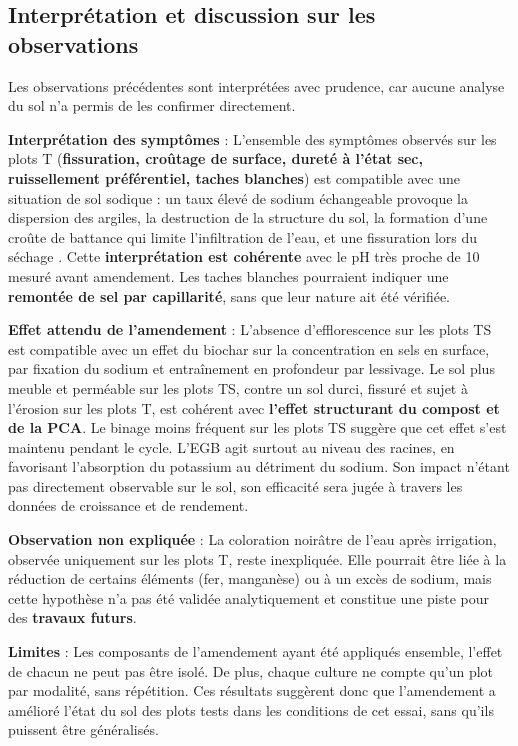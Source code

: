\subsection{Interprétation et discussion sur les observations}
Les observations précédentes sont interprétées avec prudence, car aucune analyse du sol n’a permis de les confirmer directement.

\textbf{Interprétation des symptômes} : L’ensemble des symptômes observés sur les plots T (\textbf{fissuration, croûtage de surface, dureté à l’état sec, ruissellement préférentiel, taches blanches}) est compatible avec une situation de sol sodique : 
un taux élevé de sodium échangeable provoque la dispersion des argiles, la destruction de la structure du sol, la formation d’une croûte de battance qui limite l’infiltration de l’eau, et une fissuration lors du séchage \cite{niaz_organic_2022}. 
Cette \textbf{interprétation est cohérente} avec le pH très proche de 10 mesuré avant amendement. Les taches blanches pourraient indiquer une \textbf{remontée de sel par capillarité}, sans que leur nature ait été vérifiée.

\textbf{Effet attendu de l’amendement} : L’absence d’efflorescence sur les plots TS est compatible avec un effet du biochar sur la concentration en sels en surface, par fixation du sodium et entraînement en profondeur par lessivage. 
Le sol plus meuble et perméable sur les plots TS, contre un sol durci, fissuré et sujet à l’érosion sur les plots T, est cohérent avec \textbf{l’effet structurant du compost et de la PCA}. Le binage moins fréquent sur les plots TS suggère que cet effet s’est maintenu pendant le cycle. 
L’EGB agit surtout au niveau des racines, en favorisant l’absorption du potassium au détriment du sodium. Son impact n’étant pas directement observable sur le sol, son efficacité sera jugée à travers les données de croissance et de rendement.

\textbf{Observation non expliquée} : La coloration noirâtre de l’eau après irrigation, observée uniquement sur les plots T, reste inexpliquée. 
Elle pourrait être liée à la réduction de certains éléments (fer, manganèse) ou à un excès de sodium, mais cette hypothèse n’a pas été validée analytiquement et constitue une piste pour des \textbf{travaux futurs}.

\textbf{Limites} : Les composants de l’amendement ayant été appliqués ensemble, l’effet de chacun ne peut pas être isolé. De plus, chaque culture ne compte qu’un plot par modalité, sans répétition. 
Ces résultats suggèrent donc que l’amendement a amélioré l’état du sol des plots tests dans les conditions de cet essai, sans qu’ils puissent être généralisés.
